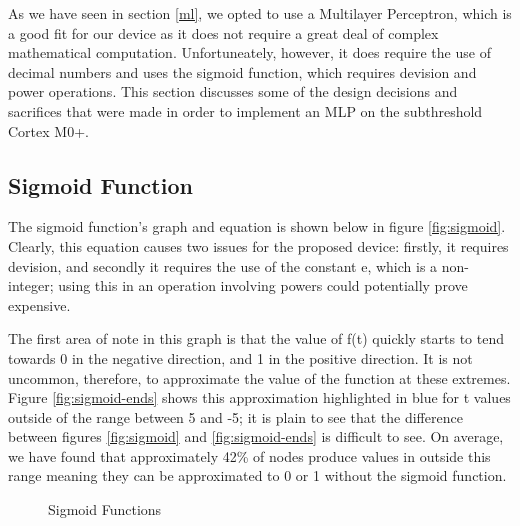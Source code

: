 
As we have seen in section \ref{ml}, we opted to use a Multilayer Perceptron, which is a good fit for our device as it does not require a great deal of complex mathematical computation. Unfortuneately, however, it does require the use of decimal numbers and uses the sigmoid function, which requires devision and power operations. This section discusses some of the design decisions and sacrifices that were made in order to implement an MLP on the subthreshold Cortex M0+.

\subsection{Sigmoid Function}
The sigmoid function's graph and equation is shown below in figure \ref{fig:sigmoid}. Clearly, this equation causes two issues for the proposed device: firstly, it requires devision, and secondly it requires the use of the constant e, which is a non-integer; using this in an operation involving powers could potentially prove expensive.

The first area of note in this graph is that the value of f(t) quickly starts to tend towards 0 in the negative direction, and 1 in the positive direction. It is not uncommon, therefore, to approximate the value of the function at these extremes. Figure \ref{fig:sigmoid-ends} shows this approximation highlighted in blue for t values outside of the range between 5 and -5; it is plain to see that the difference between figures \ref{fig:sigmoid} and \ref{fig:sigmoid-ends} is difficult to see. On average, we have found that approximately 42\%  of nodes produce values in outside this range meaning they can be approximated to 0 or 1 without the sigmoid function.

\begin{figure}[!h]
    \centering
    \caption{Sigmoid Functions \label{fig:sigmoid-options}}
\end{figure}

